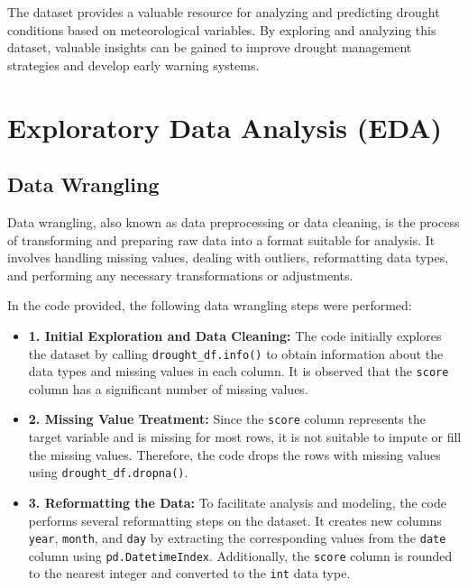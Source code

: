 \documentclass{article}
\begin{document}
The dataset provides a valuable resource for analyzing and predicting drought conditions based on meteorological variables. By exploring and analyzing this dataset, valuable insights can be gained to improve drought management strategies and develop early warning systems.

\section{Exploratory Data Analysis (EDA)}

\subsection{Data Wrangling}

Data wrangling, also known as data preprocessing or data cleaning, is the process of transforming and preparing raw data into a format suitable for analysis. It involves handling missing values, dealing with outliers, reformatting data types, and performing any necessary transformations or adjustments.

In the code provided, the following data wrangling steps were performed:

\begin{itemize}
    \item \textbf{1. Initial Exploration and Data Cleaning:} The code initially explores the dataset by calling \texttt{drought\_df.info()} to obtain information about the data types and missing values in each column. It is observed that the \texttt{score} column has a significant number of missing values.
    
    \item \textbf{2. Missing Value Treatment:} Since the \texttt{score} column represents the target variable and is missing for most rows, it is not suitable to impute or fill the missing values. Therefore, the code drops the rows with missing values using \texttt{drought\_df.dropna()}.
    
    \item \textbf{3. Reformatting the Data:} To facilitate analysis and modeling, the code performs several reformatting steps on the dataset. It creates new columns \texttt{year}, \texttt{month}, and \texttt{day} by extracting the corresponding values from the \texttt{date} column using \texttt{pd.DatetimeIndex}. Additionally, the \texttt{score} column is rounded to the nearest integer and converted to the \texttt{int} data type.
\end{itemize}
\end{document}
